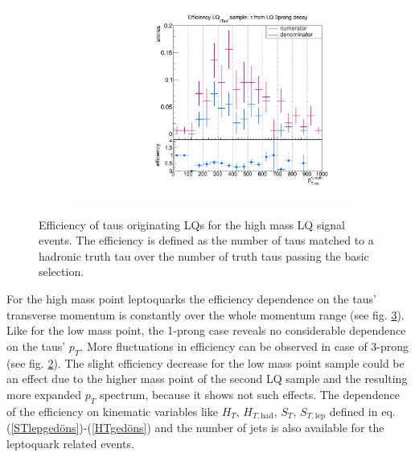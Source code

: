 \begin{figure}
\begin{subfigure}[t]{0.49\textwidth}
                \label{DividedfromLQ:signal:1prongLQ76}
                \end{subfigure}
                \begin{subfigure}[t]{0.49\textwidth}
                \includegraphics[width=\textwidth]{figures/plots/LQ76/Divided_fromLQ3prong.pdf}
                \label{DividedfromLQ:signal:3prongLQ76}
                \end{subfigure}            
\caption[Efficiency of taus originating LQs for the high mass LQ signal events.]{Efficiency of taus originating LQs for the high mass LQ signal events. The efficiency is defined as the number of taus matched to a hadronic truth tau over the number of truth taus passing the basic selection.}
\label{DividedFromLQ:signal:LQ76}
\end{figure}
%
For the high mass point leptoquarks the efficiency dependence on the taus' transverse momentum is constantly over the whole momentum range (see fig. \ref{DividedFromLQ:signal:LQ76}). Like for the low mass point, the 1-prong case reveals no considerable dependence on the taus' $p_T$. More fluctuations in efficiency can be observed in case of 3-prong (see fig. \ref{DividedfromLQ:signal:3prongLQ76}). The slight efficiency decrease for the low mass point sample could be an effect due to the higher mass point of the second LQ sample and the resulting more expanded $p_T$ spectrum, because it shows not such effects.  
The dependence of the efficiency on kinematic variables like $H_T$, $H_{T,\text{had}}$, $S_T$, $S_{T,\text{lep}}$ defined in eq. (\ref{STlepgedöns})-(\ref{HTgedöns}) and the number of jets is also available for the leptoquark related events. \newline

